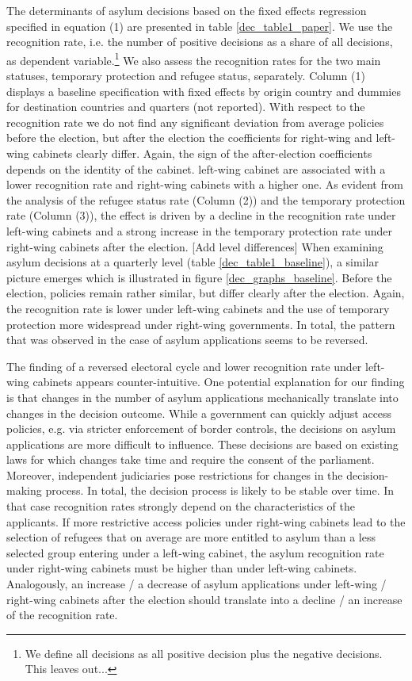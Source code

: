 \documentclass[a4paper,12pt]{article}
\begin{document}
The determinants of asylum decisions based on the fixed effects regression specified in equation (1) are presented in table \ref{dec_table1_paper}. We use the recognition rate, i.e. the number of positive decisions as a share of all decisions, as dependent variable.\footnote{We define all decisions as all positive decision plus the negative decisions. This leaves out...} We also assess the recognition rates for the two main statuses, temporary protection and refugee status, separately. Column (1) displays a baseline specification with fixed effects by origin country and dummies for destination countries and quarters (not reported). With respect to the recognition rate we do not find any significant deviation from average policies before the election, but after the election the coefficients for right-wing and left-wing cabinets clearly differ. Again, the sign of the after-election coefficients depends on the identity of the cabinet. left-wing cabinet are associated with a lower recognition rate and right-wing cabinets with a higher one. As evident from the analysis of the refugee status rate (Column (2)) and the temporary protection rate (Column (3)), the effect is driven by a decline in the recognition rate under left-wing cabinets and a strong increase in the temporary protection rate under right-wing cabinets after the election. [Add level differences] When examining asylum decisions at a quarterly level (table \ref{dec_table1_baseline}), a similar picture emerges which is illustrated in figure \ref{dec_graphs_baseline}.  Before the election, policies remain rather similar, but differ clearly after the election. Again, the recognition rate is lower under left-wing cabinets and the use of temporary protection more widespread under right-wing governments. In total, the pattern that was observed in the case of asylum applications seems to be reversed.

The finding of a reversed electoral cycle and lower recognition rate under left-wing cabinets appears counter-intuitive. One potential explanation for our finding is that changes in the number of asylum applications mechanically translate into changes in the decision outcome. While a government can quickly adjust access policies, e.g. via stricter enforcement of border controls, the decisions on asylum applications are more difficult to influence. These decisions are based on existing laws for which changes take time and require the consent of the parliament. Moreover, independent judiciaries pose restrictions for changes in the decision-making process. In total, the decision process is likely to be stable over time. In that case  recognition rates strongly depend on the characteristics of the applicants. If more restrictive access policies under right-wing cabinets lead to the selection of refugees that on average are more entitled to asylum than a less selected group entering under a left-wing cabinet, the asylum recognition rate under right-wing cabinets must be higher than under left-wing cabinets. Analogously, an increase / a decrease of asylum applications under left-wing / right-wing cabinets after the election should translate into a decline / an increase of the recognition rate.
\end{document}
